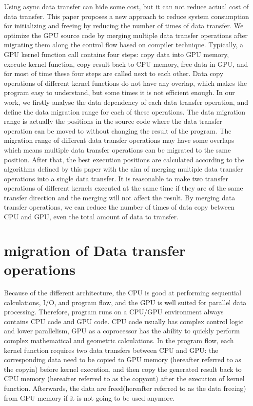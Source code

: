 \documentclass[10pt,conference]{IEEEtran}
\begin{document}
 Using async data transfer can hide some cost, but it can not reduce actual cost of data transfer. This paper proposes a new approach to reduce system consumption for initializing and freeing by reducing the number of times of data transfer. We optimize the GPU source code by merging multiple data transfer operations after migrating them along the control flow based on compiler technique. Typically, a GPU kernel function call contains four steps: copy data into GPU memory, execute kernel function, copy result back to CPU memory, free data in GPU, and for most of time these four steps are called next to each other.
Data copy operations of different kernel functions do not have any overlap, which makes the program easy to understand, but some times it is not efficient enough.
In our work, we firstly analyse the data dependency of each data transfer operation, and define the data migration range for each of these operations. The data migration range is actually the positions in the source code where the data transfer operation can be moved to without changing the result of the program.
The migration range of different data transfer operations may have some overlaps which means multiple data transfer operations can be migrated to the same position.
After that, the best execution positions are calculated according to the algorithms defined by this paper with the aim of merging multiple data transfer operations into a single data transfer.
It is reasonable to make two transfer operations of different kernels executed at the same time if they are of the same transfer direction and the merging will not affect the result. By merging data transfer operations, we can reduce the number of times of data copy between CPU and GPU, even the total amount of data to transfer.


\section{migration of Data transfer operations }
Because of the different architecture, the CPU is good at performing sequential calculations, I/O, and program flow, and the GPU is
well suited for parallel data processing. Therefore, program runs on a  CPU/GPU environment always contains CPU code and GPU code.
CPU code usually has complex control logic and lower parallelism, GPU as a coprocessor has the ability to quickly perform complex mathematical and geometric calculations.
In the program flow, each kernel function requires two data transfers between CPU and GPU: the corresponding data need to be copied to GPU memory (hereafter referred to as the copyin) before kernel execution, and then copy the generated result back to CPU memory (hereafter referred to as the copyout) after the execution of kernel function. Afterwards, the data are freed(hereafter referred to as the data freeing) from GPU memory if it is not going to be used anymore.
\end{document}
